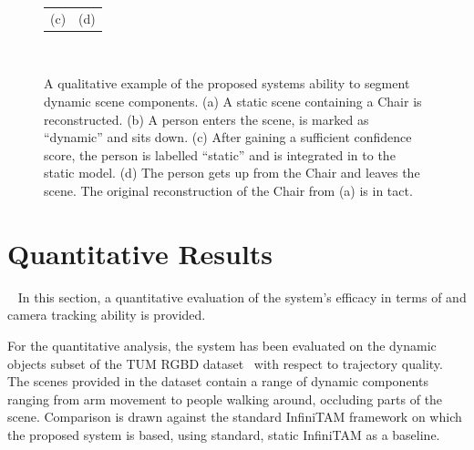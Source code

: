\begin{figure}[!htbp]
\begin{tabular}{cc}
    (c) & (d)
  \end{tabular}
  \caption[Motion Segmentation Qualitative Results II]
  {A qualitative example of the proposed systems ability to segment
    dynamic scene components.
    (a) A static scene containing a Chair is reconstructed.
    (b) A person enters the scene, is marked as ``dynamic'' and sits down.
    (c) After gaining a sufficient confidence score, the person is labelled
    ``static'' and is integrated in to the static model.
    (d) The person gets up from the Chair and leaves the scene. The original
    reconstruction of the Chair from (a) is in tact.}
~\label{figure:moseg_qualitative_chair}
\end{figure}

\section{Quantitative Results}
~\label{sec:moseg_quantitative}
In this section, a quantitative evaluation of the system's efficacy in terms of
and camera tracking ability is provided.

For the quantitative analysis, the system has been evaluated on the dynamic
objects subset of the TUM RGBD dataset~\cite{Sturm2012} with respect to
trajectory quality. The scenes provided in the dataset contain a range of
dynamic components ranging from arm movement to people walking around, occluding
parts of the scene. Comparison is drawn against the standard InfiniTAM framework
on which the proposed system is based, using standard, static InfiniTAM as a
baseline.

